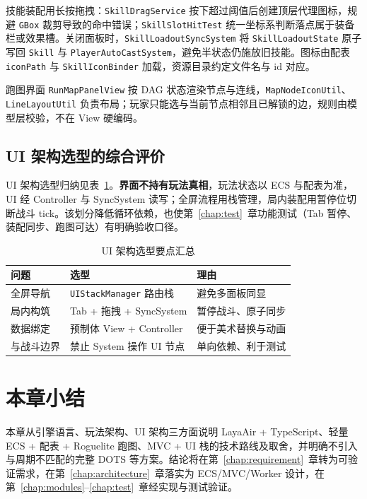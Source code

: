 技能装配用长按拖拽：\texttt{SkillDragService} 按下超过阈值后创建顶层代理图标，规避 \texttt{GBox} 裁剪导致的命中错误；\texttt{SkillSlotHitTest} 统一坐标系判断落点属于装备栏或效果槽。关闭面板时，\texttt{SkillLoadoutSyncSystem} 将 \texttt{SkillLoadoutState} 原子写回 \texttt{Skill} 与 \texttt{PlayerAutoCastSystem}，避免半状态仍施放旧技能。图标由配表 \texttt{iconPath} 与 \texttt{SkillIconBinder} 加载，资源目录约定文件名与 id 对应。

跑图界面 \texttt{RunMapPanelView} 按 DAG 状态渲染节点与连线，\texttt{MapNodeIconUtil}、\texttt{LineLayoutUtil} 负责布局；玩家只能选与当前节点相邻且已解锁的边，规则由模型层校验，不在 View 硬编码。

\subsection{UI 架构选型的综合评价}

UI 架构选型归纳见表~\ref{tab:ui-arch-summary}。\textbf{界面不持有玩法真相}，玩法状态以 ECS 与配表为准，UI 经 Controller 与 SyncSystem 读写；全屏流程用栈管理，局内装配用暂停位切断战斗 tick。该划分降低循环依赖，也使第~\ref{chap:test}~章功能测试（Tab 暂停、装配同步、跑图可达）有明确验收口径。

\begin{table}[htbp]
  \centering
  \caption{UI 架构选型要点汇总}
  \label{tab:ui-arch-summary}
  \begin{tabular}{p{3.0cm}p{4.0cm}p{5.5cm}}
    \toprule
    \textbf{问题} & \textbf{选型} & \textbf{理由} \\
    \midrule
    全屏导航 & \texttt{UIStackManager} 路由栈 & 避免多面板同显 \\
    局内构筑 & Tab + 拖拽 + SyncSystem & 暂停战斗、原子同步 \\
    数据绑定 & 预制体 View + Controller & 便于美术替换与动画 \\
    与战斗边界 & 禁止 System 操作 UI 节点 & 单向依赖、利于测试 \\
    \bottomrule
  \end{tabular}
\end{table}

\section{本章小结}

本章从引擎语言、玩法架构、UI 架构三方面说明 LayaAir + TypeScript、轻量 ECS + 配表 + Roguelite 跑图、MVC + UI 栈的技术路线及取舍，并明确不引入与周期不匹配的完整 DOTS 等方案。结论将在第~\ref{chap:requirement}~章转为可验证需求，在第~\ref{chap:architecture}~章落实为 ECS/MVC/Worker 设计，在第~\ref{chap:modules}--\ref{chap:test}~章经实现与测试验证\cite{ullmann2025sydra,gregory2018game,cantrell2018unity,heijstek2011empirical}。
